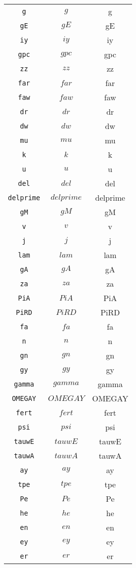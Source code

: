 \begin{center}
\begin{longtable}{ccc}
\texttt{g} & $g$ & g\\
\texttt{gE} & $gE$ & gE\\
\texttt{iy} & $iy$ & iy\\
\texttt{gpc} & $gpc$ & gpc\\
\texttt{zz} & $zz$ & zz\\
\texttt{far} & $far$ & far\\
\texttt{faw} & $faw$ & faw\\
\texttt{dr} & $dr$ & dr\\
\texttt{dw} & $dw$ & dw\\
\texttt{mu} & $mu$ & mu\\
\texttt{k} & $k$ & k\\
\texttt{u} & $u$ & u\\
\texttt{del} & $del$ & del\\
\texttt{delprime} & $delprime$ & delprime\\
\texttt{gM} & $gM$ & gM\\
\texttt{v} & $v$ & v\\
\texttt{j} & $j$ & j\\
\texttt{lam} & $lam$ & lam\\
\texttt{gA} & $gA$ & gA\\
\texttt{za} & $za$ & za\\
\texttt{PiA} & $PiA$ & PiA\\
\texttt{PiRD} & $PiRD$ & PiRD\\
\texttt{fa} & $fa$ & fa\\
\texttt{n} & $n$ & n\\
\texttt{gn} & $gn$ & gn\\
\texttt{gy} & $gy$ & gy\\
\texttt{gamma} & $gamma$ & gamma\\
\texttt{OMEGAY} & $OMEGAY$ & OMEGAY\\
\texttt{fert} & $fert$ & fert\\
\texttt{psi} & $psi$ & psi\\
\texttt{tauwE} & $tauwE$ & tauwE\\
\texttt{tauwA} & $tauwA$ & tauwA\\
\texttt{ay} & $ay$ & ay\\
\texttt{tpe} & $tpe$ & tpe\\
\texttt{Pe} & $Pe$ & Pe\\
\texttt{he} & $he$ & he\\
\texttt{en} & $en$ & en\\
\texttt{ey} & $ey$ & ey\\
\texttt{er} & $er$ & er\\

\end{longtable}
\end{center}
